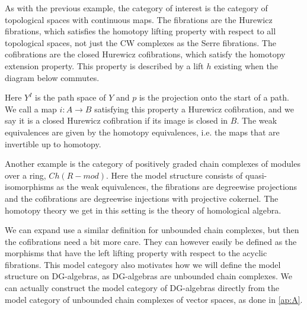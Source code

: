 \begin{example}
\label{ex:strom_model}
As with the previous example, the category of interest is the category of topological spaces with continuous maps. The fibrations are the Hurewicz fibrations, which satisfies the homotopy lifting property with respect to all topological spaces, not just the CW complexes as the Serre fibrations. The cofibrations are the closed Hurewicz cofibrations, which satisfy the homotopy extension property. This property is described by a lift $h$ existing when the diagram below commutes.

\begin{center}
\end{center}

Here $Y^I$ is the path space of $Y$ and $p$ is the projection onto the start of a path. We call a map $i:A\longrightarrow B$ satisfying this property a Hurewicz cofibration, and we say it is a closed Hurewicz cofibration if its image is closed in $B$. The weak equivalences are given by the homotopy equivalences, i.e. the maps that are invertible up to homotopy.  
\end{example}

\begin{example}
\label{ex:chain_complexes}
Another example is the category of positively graded chain complexes of modules over a ring, $Ch(R-mod)$. Here the model structure consists of quasi-isomorphisms as the weak equivalences, the fibrations are degreewise projections and the cofibrations are degreewise injections with projective cokernel. The homotopy theory we get in this setting is the theory of homological algebra. 

We can expand use a similar definition for unbounded chain complexes, but then the cofibrations need a bit more care. They can however easily be defined as the morphisms that have the left lifting property with respect to the acyclic fibrations. This model category also motivates how we will define the model structure on DG-algebras, as DG-algebras are unbounded chain complexes. We can actually construct the model category of DG-algebras directly from the model category of unbounded chain complexes of vector spaces, as done in \cref{ap:A}. 
\end{example}


